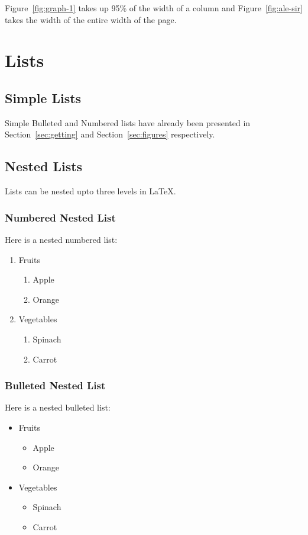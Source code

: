 \documentclass[fleqn, 11pt, twoside]{IOEGC2019}
\begin{document}
Figure~\ref{fig:graph-1} takes up 95\% of the width of a column and 
Figure~\ref{fig:ale-sir} takes the width of the entire width of the page.


\section{Lists} \label{sec:lists}

\subsection{Simple Lists}
Simple Bulleted and Numbered lists have already been presented in 
Section~\ref{sec:getting} and Section~\ref{sec:figures} respectively.

\subsection{Nested Lists}
Lists can be nested upto three levels in \LaTeX.

\subsubsection{Numbered Nested List}
Here is a nested numbered list:

\begin{enumerate}
  \item Fruits
    \begin{enumerate}
      \item Apple
      \item Orange
    \end{enumerate}
  \item Vegetables
    \begin{enumerate}
      \item Spinach
      \item Carrot
    \end{enumerate}
\end{enumerate}

\subsubsection{Bulleted Nested List}
Here is a nested bulleted list:

\begin{itemize}[noitemsep] 
  \item Fruits
    \begin{itemize}[noitemsep] 
      \item Apple
      \item Orange
    \end{itemize}
  \item Vegetables
    \begin{itemize}[noitemsep] 
      \item Spinach
      \item Carrot
    \end{itemize}
\end{itemize}
\end{document}
